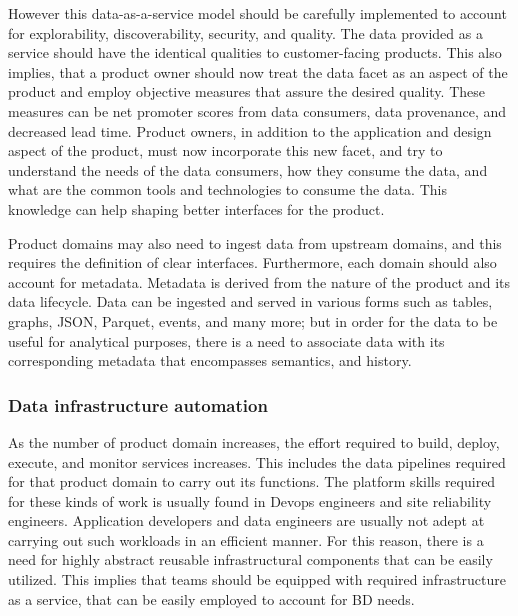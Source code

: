 \documentclass[review]{elsarticle}
\begin{document}

However this data-as-a-service model should be carefully implemented to account for explorability, discoverability, security, and quality. The data provided as a service should have the identical qualities to customer-facing products. This also implies, that a product owner should now treat the data facet as an aspect of the product and employ objective measures that assure the desired quality. These measures can be net promoter scores from data consumers, data provenance, and decreased lead time. Product owners, in addition to the application and design aspect of the product, must now incorporate this new facet, and try to understand the needs of the data consumers, how they consume the data, and what are the common tools and technologies to consume the data. This knowledge can help shaping better interfaces for the product.

Product domains may also need to ingest data from upstream domains, and this requires the definition of clear interfaces. Furthermore, each domain should also account for metadata. Metadata is derived from the nature of the product and its data lifecycle. Data can be ingested and served in various forms such as tables, graphs, JSON, Parquet, events, and many more; but in order for the data to be useful for analytical purposes, there is a need to associate data with its corresponding metadata that encompasses semantics, and history.

\subsubsection{Data infrastructure automation}

As the number of product domain increases, the effort required to build, deploy, execute, and monitor services increases. This includes the data pipelines required for that product domain to carry out its functions. The platform skills required for these kinds of work is usually found in Devops engineers and site reliability engineers. Application developers and data engineers are usually not adept at carrying out such workloads in an efficient manner. For this reason, there is a need for highly abstract reusable infrastructural components that can be easily utilized. This implies that teams should be equipped with required infrastructure as a service, that can be easily employed to account for BD needs.
\end{document}
